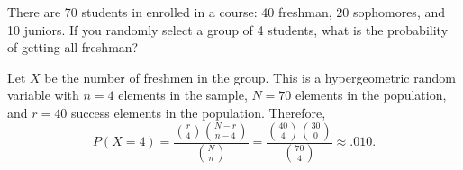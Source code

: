 \question There are 70 students in enrolled in a course: 40 freshman, 20
sophomores, and 10 juniors.  If you randomly select a group of 4 students,
what is the probability of getting all freshman?


\begin{solution}
Let $X$ be the number of freshmen in the group.  This is a
hypergeometric random variable with $n = 4$ elements in the sample, $N = 70$
elements in the population, and $r = 40$ success elements in the population.
Therefore,
\[
  P(X = 4)
    = \frac{\binom{r}{4} \binom{N - r}{n - 4}}{\binom{N}{n}}
    = \frac{\binom{40}{4} \binom{30}{0}}{\binom{70}{4}}
    \approx .010.
\]
\end{solution}


